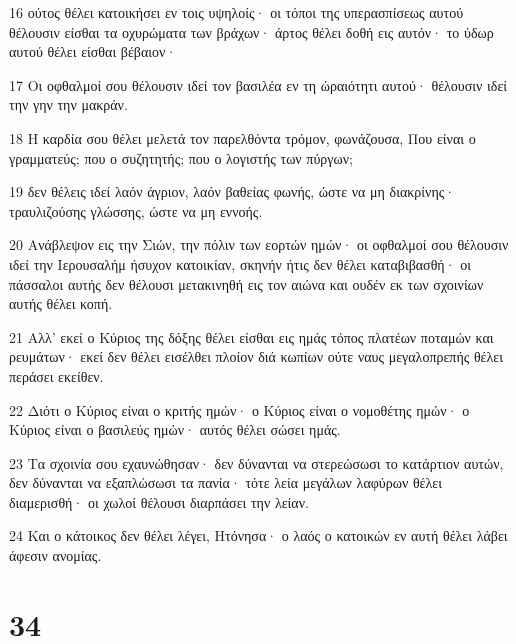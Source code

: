 \par 16 ούτος θέλει κατοικήσει εν τοις υψηλοίς· οι τόποι της υπερασπίσεως αυτού θέλουσιν είσθαι τα οχυρώματα των βράχων· άρτος θέλει δοθή εις αυτόν· το ύδωρ αυτού θέλει είσθαι βέβαιον·
\par 17 Οι οφθαλμοί σου θέλουσιν ιδεί τον βασιλέα εν τη ώραιότητι αυτού· θέλουσιν ιδεί την γην την μακράν.
\par 18 Η καρδία σου θέλει μελετά τον παρελθόντα τρόμον, φωνάζουσα, Που είναι ο γραμματεύς; που ο συζητητής; που ο λογιστής των πύργων;
\par 19 δεν θέλεις ιδεί λαόν άγριον, λαόν βαθείας φωνής, ώστε να μη διακρίνης· τραυλιζούσης γλώσσης, ώστε να μη εννοής.
\par 20 Ανάβλεψον εις την Σιών, την πόλιν των εορτών ημών· οι οφθαλμοί σου θέλουσιν ιδεί την Ιερουσαλήμ ήσυχον κατοικίαν, σκηνήν ήτις δεν θέλει καταβιβασθή· οι πάσσαλοι αυτής δεν θέλουσι μετακινηθή εις τον αιώνα και ουδέν εκ των σχοινίων αυτής θέλει κοπή.
\par 21 Αλλ' εκεί ο Κύριος της δόξης θέλει είσθαι εις ημάς τόπος πλατέων ποταμών και ρευμάτων· εκεί δεν θέλει εισέλθει πλοίον διά κωπίων ούτε ναυς μεγαλοπρεπής θέλει περάσει εκείθεν.
\par 22 Διότι ο Κύριος είναι ο κριτής ημών· ο Κύριος είναι ο νομοθέτης ημών· ο Κύριος είναι ο βασιλεύς ημών· αυτός θέλει σώσει ημάς.
\par 23 Τα σχοινία σου εχαυνώθησαν· δεν δύνανται να στερεώσωσι το κατάρτιον αυτών, δεν δύνανται να εξαπλώσωσι τα πανία· τότε λεία μεγάλων λαφύρων θέλει διαμερισθή· οι χωλοί θέλουσι διαρπάσει την λείαν.
\par 24 Και ο κάτοικος δεν θέλει λέγει, Ητόνησα· ο λαός ο κατοικών εν αυτή θέλει λάβει άφεσιν ανομίας.

\chapter{34}

